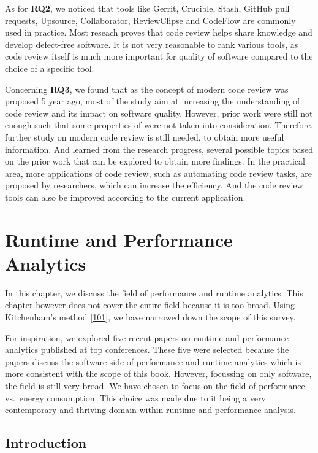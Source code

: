 \documentclass[]{book}
\begin{document}
As for \textbf{RQ2}, we noticed that tools like Gerrit, Crucible, Stash,
GitHub pull requests, Upsource, Collaborator, ReviewClipse and CodeFlow
are commonly used in practice. Most reseach proves that code review
helps share knowledge and develop defect-free software. It is not very
reasonable to rank various tools, as code review itself is much more
important for quality of software compared to the choice of a specific
tool.

Concerning \textbf{RQ3}, we found that as the concept of modern code
review was proposed 5 year ago, most of the study aim at increasing the
understanding of code review and its impact on software quality.
However, prior work were still not enough such that some properties of
were not taken into consideration. Therefore, further study on modern
code review is still needed, to obtain more useful information. And
learned from the research progress, several possible topics based on the
prior work that can be explored to obtain more findings. In the
practical area, more applications of code review, such as automating
code review tasks, are proposed by researchers, which can increase the
efficiency. And the code review tools can also be improved according to
the current application.

\chapter{Runtime and Performance
Analytics}\label{runtime-and-performance-analytics}

In this chapter, we discuss the field of performance and runtime
analytics. This chapter however does not cover the entire field because
it is too broad. Using Kitchenham's method
{[}\protect\hyperlink{ref-kitchenham2004procedures}{101}{]}, we have
narrowed down the scope of this survey.

For inspiration, we explored five recent papers on runtime and
performance analytics published at top conferences. These five were
selected because the papers discuss the software side of performance and
runtime analytics which is more consistent with the scope of this book.
However, focussing on only software, the field is still very broad. We
have chosen to focus on the field of performance vs.~energy consumption.
This choice was made due to it being a very contemporary and thriving
domain within runtime and performance analysis.

\section{Introduction}\label{introduction-1}
\end{document}
